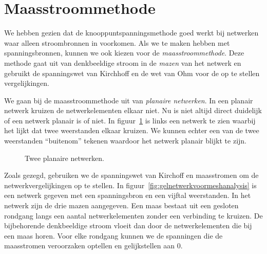 \fi
\iffalse

\section{Maasstroommethode}
We hebben gezien dat de knooppuntspanningsmethode goed werkt bij netwerken waar alleen stroombronnen in voorkomen. Als we te maken hebben met spanningsbronnen, kunnen we ook kiezen voor de \textsl{maasstroommethode}. Deze methode gaat uit van denkbeeldige stroom in de \textsl{mazen} van het netwerk en gebruikt de spanningswet van Kirchhoff en de wet van Ohm voor de op te stellen vergelijkingen.

We gaan bij de maasstroommethode uit van \textsl{planaire netwerken}. In een planair netwerk kruizen de netwerkelementen elkaar niet. Nu is niet altijd direct duidelijk of een netwerk planair is of niet. In figuur~\ref{fig:gelplanairnetwerk} is links een netwerk te zien waarbij het lijkt dat twee weerstanden elkaar kruizen. We kunnen echter een van de twee weerstanden ``buitenom'' tekenen waardoor het netwerk planair blijkt te zijn.

\begin{figure}[!ht]
\centering
{}
\caption{Twee planaire netwerken.}
\label{fig:gelplanairnetwerk}
\end{figure}

Zoals gezegd, gebruiken we de spanningswet van Kirchoff en maasstromen om de netwerkvergelijkingen op te stellen. In figuur~\ref{fig:gelnetwerkvoormeshanalysis} is een netwerk gegeven met een spanningsbron en een vijftal weerstanden. In het netwerk zijn de drie mazen aangegeven. Een maas bestaat uit een gesloten rondgang langs een aantal netwerkelementen zonder een verbinding te kruizen. De bijbehorende denkbeeldige stroom vloeit dan door de netwerkelementen die bij een maas horen. Voor elke rondgang kunnen we de spanningen die de maasstromen veroorzaken optellen en gelijkstellen aan 0.

